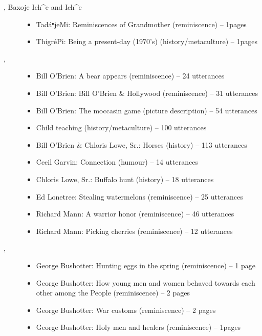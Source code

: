 \documentclass[output=paper]{LSP/langsci}
\begin{document}
\begin{description}
\item[\citet{GoodTracks2004b}, Baxoje Ich\^{}e and  Ich\^{}e]\hfill
\begin{itemize}
\item TadáⁿjeMi: Reminiscences of Grandmother (reminiscence) -- 1\textonehalf{}pages
\item ThigréPi: Being a present-day (1970’s)  (history/metaculture) -- 1\textonehalf{}pages
\end{itemize}

\item[\citet{HartmannMarschke2010}, ]\hfill
\begin{itemize}
\item Bill O’Brien: A bear appears (reminiscence) -- 24 utterances
\item Bill O’Brien: Bill O’Brien \& Hollywood (reminiscence) -- 31 utterances
\item Bill O’Brien: The moccasin game (picture description) -- 54 utterances
\item Child teaching (history/metaculture) -- 100 utterances
\item Bill O’Brien \& Chloris Lowe, Sr.: Horses (history) -- 113 utterances
\item Cecil Garvin: Connection (humour) -- 14 utterances
\item Chloris Lowe, Sr.: Buffalo hunt (history) -- 18 utterances
\item Ed Lonetree: Stealing watermelons (reminiscence) -- 25 utterances
\item Richard Mann: A warrior honor (reminiscence) -- 46 utterances
\item Richard Mann: Picking cherries (reminiscence) -- 12 utterances
\end{itemize}

\item[\citet{Ingham2003}, ]\hfill
\begin{itemize}
\item George Bushotter: Hunting eggs in the spring (reminiscence) -- 1 page
\item George Bushotter: How young men and women behaved towards each other among the People (reminiscence) -- 2 pages
\item George Bushotter: War customs (reminiscence) -- 2 pages
\item George Bushotter: Holy men and healers (reminiscence) -- 1\textonehalf{}pages
\end{itemize}


\end{description}
\end{document}
